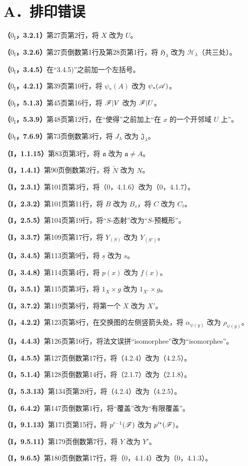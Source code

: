 
\section*{A．排印错误}
\newcommand{\typo}[2]{\par\smallskip\noindent\textbf{（#1）}\quad #2\par}
\typo{$0_{\mathrm I}$，3.2.1}{第27页第2行，将 $X$ 改为 $U$。}
\typo{$0_{\mathrm I}$，3.2.6}{第27页倒数第1行及第28页第1行，将 $\mathfrak H_\lambda$ 改为 $\mathscr H_\lambda$（共三处）。}
\typo{$0_{\mathrm I}$，3.4.5}{在“3.4.5)”之前加一个左括号。}
\typo{$0_{\mathrm I}$，4.2.1}{第39页第10行，将 $\psi_*(A)$ 改为 $\psi_*(\mathscr A)$。}
\typo{$0_{\mathrm I}$，5.1.3}{第45页第16行，将 $\mathscr F|V$ 改为 $\mathscr F|U$。}
\typo{$0_{\mathrm I}$，5.3.9}{第48页第12行，在“使得”之前加上“在 $x$ 的一个开邻域 $U$ 上”。}
\typo{$0_{\mathrm I}$，7.6.9}{第73页倒数第3行，将 $J_\lambda$ 改为 $\mathfrak J_\lambda$。}
\typo{I，1.1.15}{第83页第3行，将 $\mathfrak a$ 改为 $\mathfrak a\ne A$。}
\typo{I，1.4.1}{第90页倒数第2行，将 $\widetilde N$ 改为 $N$。}
\typo{I，2.3.1}{第101页第3行，将（0，4.1.6）改为（0，4.1.7）。}
\typo{I，2.3.2}{第101页第11行，将 $B$ 改为 $B_s$，将 $C$ 改为 $C_t$。}
\typo{I，2.5.5}{第104页第19行，将“$S$-态射”改为“$S$-预概形”。}
\typo{I，3.3.7}{第109页第17行，将 $Y_{(S)}$ 改为 $Y_{(S')}$。}
\typo{I，3.4.5}{第113页第9行，将 $\underline s$ 改为 $s$。}
\typo{I，3.4.8}{第114页第4行，将 $p(x)$ 改为 $f(x)$。}
\typo{I，3.5.1}{第115页第3行，将 $1_X\times g$ 改为 $1_{X'}\times g$。}
\typo{I，3.7.2}{第119页第8行，将第一个 $X$ 改为 $X'$。}
\typo{I，4.2.2}{第123页第8行，在交换图的左侧竖箭头处，将 $\alpha_{\psi(y)}$ 改为 $\rho_{\psi(y)}$。}
\typo{I，4.4.3}{第126页第16行，将法文误拼“isomorphee”改为“isomorphes”。}
\typo{I，4.5.5}{第127页倒数第17行，将（4.2.4）改为（4.2.5）。}
\typo{I，5.1.4}{第128页倒数第14行，将（2.1.7）改为（2.1.8）。}
\typo{I，5.3.13}{第134页第20行，将（4.2.4）改为（4.2.5）。}
\typo{I，6.4.2}{第147页倒数第1行，将“覆盖”改为“有限覆盖”。}
\typo{I，9.1.13}{第171页第15行，将 $p'^{-1}(\mathscr F)$ 改为 $p'^*(\mathscr F)$。}
\typo{I，9.5.11}{第179页倒数第7行，将 $Y$ 改为 $Y'$。}
\typo{I，9.6.5}{第180页倒数第17行，将（0，4.1.4）改为（0，4.1.3）。}
